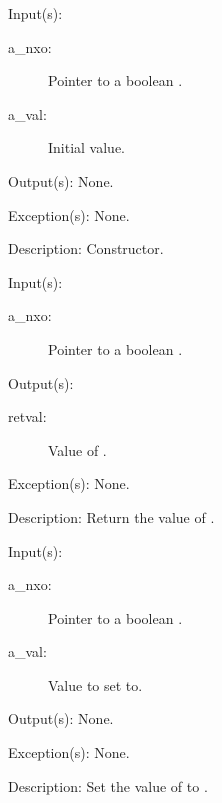 \begin{capi}
\label{nxo_boolean_new}
	\begin{capilist}
	\item[Input(s): ]
		\begin{description}\item[]
		\item[a\_nxo: ]
			Pointer to a boolean .
		\item[a\_val: ]
			Initial value.
		\end{description}
	\item[Output(s): ] None.
	\item[Exception(s): ] None.
	\item[Description: ]
		Constructor.
	\end{capilist}
\label{nxo_boolean_get}
	\begin{capilist}
	\item[Input(s): ]
		\begin{description}\item[]
		\item[a\_nxo: ]
			Pointer to a boolean \classname{nxo}.
		\end{description}
	\item[Output(s): ]
		\begin{description}\item[]
		\item[retval: ]
			Value of \cvar{a\_nxo}.
		\end{description}
	\item[Exception(s): ] None.
	\item[Description: ]
		Return the value of \cvar{a\_nxo}.
	\end{capilist}
\label{nxo_boolean_set}
	\begin{capilist}
	\item[Input(s): ]
		\begin{description}\item[]
		\item[a\_nxo: ]
			Pointer to a boolean .
		\item[a\_val: ]
			Value to set  to.
		\end{description}
	\item[Output(s): ] None.
	\item[Exception(s): ] None.
	\item[Description: ]
		Set the value of  to \cvar{a\_val}.
	\end{capilist}
\end{capi}
